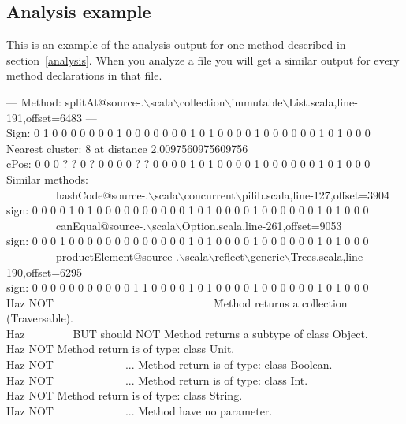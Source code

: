 \documentclass[12pt]{article}
\newcommand{\code}[1]{{\fontfamily{phv}\selectfont \small{\begin{tabbing} #1 \end{tabbing}}}}
\begin{document}
\subsection{Analysis example}
\label{annexe1}
This is an example of the analysis output for one method described in section~\ref{analysis}. When you analyze a file you will get a similar output for every method declarations in that file.\code{
--- Method: splitAt@source-.$\backslash$scala$\backslash$collection$\backslash$immutable$\backslash$List.scala,line-191,offset=6483 ---\\
Sign: 0 1 0 0 0 0 0 0 0 1 0 0 0 0 0 0 0 1 0 1 0 0 0 0 1 0 0 0 0 0 0 1 0 1 0 0 0\\
Nearest cluster: 8 at distance 2.0097560975609756\\
cPos: 0 0 0 ? ? 0 ? 0 0 0 0 ? ? 0 0 0 0 1 0 1 0 0 0 0 1 0 0 0 0 0 0 1 0 1 0 0 0\\
Similar methods:\\
\ \ \ \ \ \ \ \ \ hashCode@source-.$\backslash$scala$\backslash$concurrent$\backslash$pilib.scala,line-127,offset=3904\\
sign: 0 0 0 0 1 0 1 0 0 0 0 0 0 0 0 0 0 1 0 1 0 0 0 0 1 0 0 0 0 0 0 1 0 1 0 0 0\\
\ \ \ \ \ \ \ \ \ canEqual@source-.$\backslash$scala$\backslash$Option.scala,line-261,offset=9053\\
sign: 0 0 0 1 0 0 0 0 0 0 0 0 0 0 0 0 0 1 0 1 0 0 0 0 1 0 0 0 0 0 0 1 0 1 0 0 0\\
\ \ \ \ \ \ \ \ \ productElement@source-.$\backslash$scala$\backslash$reflect$\backslash$generic$\backslash$Trees.scala,line-190,offset=6295\\
sign: 0 0 0 0 0 0 0 0 0 0 0 1 1 0 0 0 0 1 0 1 0 0 0 0 1 0 0 0 0 0 0 1 0 1 0 0 0\\
Haz NOT\ \ \ \ \ \ \ \ \ \ \ \ \ \ \ \ \ \ \ \ \ \ \ \ \ \ \ \ \ \=Method returns a collection (Traversable).\\
Haz \ \ \ \ \ \ \ \ BUT should NOT Method returns a subtype of class Object.\\
Haz NOT                \>Method return is of type: class Unit.\\
Haz NOT\ \ \ \ \ \ \ \ \ \ \ \ \ ...       \>Method return is of type: class Boolean.\\
Haz NOT\ \ \ \ \ \ \ \ \ \ \ \ \ ...       \>Method return is of type: class Int.\\
Haz NOT                \>Method return is of type: class String.\\
Haz NOT\ \ \ \ \ \ \ \ \ \ \ \ \     ...       \>Method have no parameter.\\
}
\end{document}

